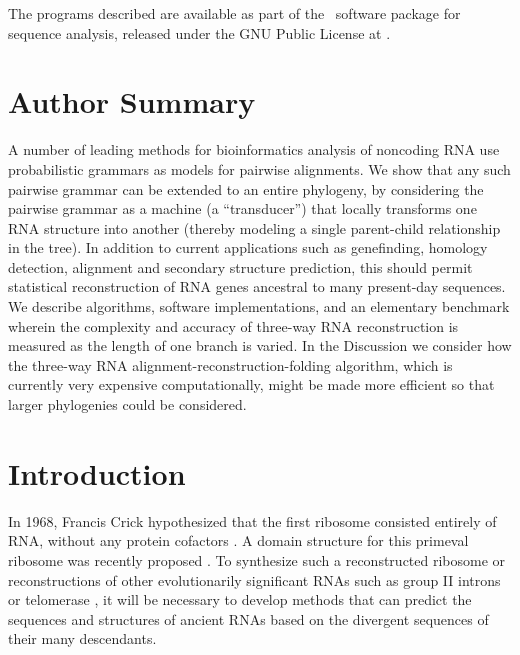 \documentclass[10pt]{article}
\begin{document}
The programs described are available
as part of the \dart\ software package for sequence analysis,
released under the GNU Public License at
\darturl.


\newpage
\section*{Author Summary}

A number of leading methods for bioinformatics analysis of noncoding RNA
 use probabilistic grammars as models for pairwise alignments.
We show that any such pairwise grammar can be extended to an entire phylogeny,
 by considering the pairwise grammar as a machine (a ``transducer'') that locally transforms one RNA structure into another
 (thereby modeling a single parent-child relationship in the tree).
In addition to current applications such as genefinding, homology detection, alignment and secondary structure prediction,
 this should permit statistical reconstruction of RNA genes ancestral to many present-day sequences.
We describe algorithms, software implementations, and an elementary benchmark wherein
 the complexity and accuracy of three-way RNA reconstruction is measured as the length of one branch is varied.
In the Discussion we consider how the three-way RNA alignment-reconstruction-folding algorithm, which is currently very expensive computationally,
 might be made more efficient so that larger phylogenies could be considered.

\newpage
\section*{Introduction}
In 1968, Francis Crick hypothesized that the first ribosome consisted entirely of RNA, without any protein cofactors \cite{Crick68}.
A domain structure for this primeval ribosome was recently proposed \cite{SmithEtAl2008}.
To synthesize such a reconstructed ribosome or reconstructions of other evolutionarily significant RNAs
such as group II introns \cite{LehmannSchmidt2003} or telomerase \cite{AntalEtAl2002},
it will be necessary to develop methods that can predict the sequences
and structures of ancient RNAs
based on the divergent sequences of their many descendants.
\end{document}

